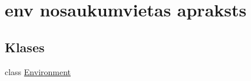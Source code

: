 \hypertarget{namespaceenv}{}\section{env nosaukumvietas apraksts}
\label{namespaceenv}
\subsection*{Klases}
\begin{DoxyCompactItemize}
\item 
class \hyperlink{classenv_1_1_environment}{Environment}
\end{DoxyCompactItemize}
